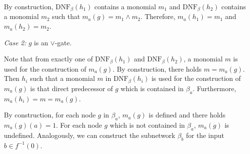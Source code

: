 \documentclass[11pt]{article}
\begin{document}
\smallskip
By construction, $\mbox{DNF}_{\beta}(h_1)$ contains a monomial $m_1$ and $\mbox{DNF}_{\beta}(h_2)$ contains a monomial
$m_2$ such that $m_a(g) = m_1 \wedge m_2$. Therefore, $m_a(h_1) = m_1$ and $m_a(h_2) = m_2$.

\smallskip
\noindent
{\em Case 2:} $g$ is an $\vee$-gate.

\smallskip
Note that from exactly one of $\mbox{DNF}_{\beta}(h_1)$ and $\mbox{DNF}_{\beta}(h_2)$, a monomial $m$ is used for the
construction of $m_a(g)$. By construction, there holds $m = m_a(g)$. Then $h_i$ such that a monomial $m$ in
$\mbox{DNF}_{\beta}(h_i)$ is used for the construction of $m_a(g)$ is that direct predecessor of $g$ which is contained
in $\beta_a$. Furthermore, $m_a(h_i) = m = m_a(g)$.

\smallskip
By construction, for each node $g$ in $\beta_a$, $m_a(g)$ is defined and there holds $m_a(g)(a) = 1$. For each node
$g$ which is not contained in $\beta_a$, $m_a(g)$ is undefined.
Analogously, we can construct the subnetwork $\beta_b$ for the input $b \in f^{-1}(0)$.

\end{document}
